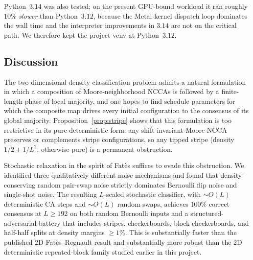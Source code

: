 \documentclass[11pt,a4paper]{article}
\begin{document}
Python~\(3.14\) was also tested; on the present GPU-bound workload it ran
roughly \(10\%\) \emph{slower} than Python~\(3.12\), because the Metal kernel
dispatch loop dominates the wall time and the interpreter improvements in
\(3.14\) are not on the critical path.  We therefore kept the project venv
at Python~\(3.12\).

\subsection{Discussion}

The two-dimensional density classification problem admits a natural
formulation in which a composition of Moore-neighborhood NCCAs is followed by
a finite-length phase of local majority, and one hopes to find schedule
parameters for which the composite map drives every initial configuration to
the consensus of its global majority.  Proposition~\ref{prop:stripe} shows
that this formulation is too restrictive in its pure deterministic form: any
shift-invariant Moore-NCCA preserves or complements stripe configurations, so
any tipped stripe (density \(1/2 \pm 1/L^2\), otherwise pure) is a permanent
obstruction.

Stochastic relaxation in the spirit of Fat\`{e}s suffices to evade this
obstruction.  We identified three qualitatively different noise mechanisms
and found that density-conserving random pair-swap noise strictly dominates
Bernoulli flip noise and single-shot noise.  The resulting \(L\)-scaled
stochastic classifier, with \(\sim O(L)\) deterministic CA steps and
\(\sim O(L)\) random swaps, achieves \(100\%\) correct consensus at
\(L\geq 192\) on both random Bernoulli inputs and a structured-adversarial
battery that includes stripes, checkerboards, block-checkerboards, and
half-half splits at density margins \(\geq 1\%\).  This is substantially
faster than the published 2D Fat\`{e}s--Regnault result and substantially
more robust than the 2D deterministic repeated-block family studied earlier
in this project.
\end{document}
